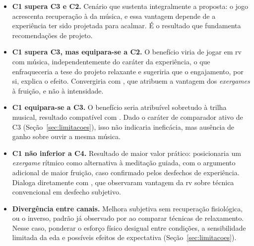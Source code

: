 \begin{itemize}
    \item \textbf{C1 supera C3 e C2.} Cenário que sustenta integralmente a proposta: o jogo acrescenta recuperação à da música, e essa vantagem depende de a experiência ter sido projetada para acalmar. É o resultado que fundamenta recomendações de projeto.
    \item \textbf{C1 supera C3, mas equipara-se a C2.} O benefício viria de jogar em \gls{rv} com música, independentemente do caráter da experiência, o que enfraqueceria a tese do projeto relaxante e sugeriria que o engajamento, por si, explica o efeito. Convergiria com \citet{RubioArias2024}, que atribuem a vantagem dos \textit{exergames} à fruição, e não à intensidade.
    \item \textbf{C1 equipara-se a C3.} O benefício seria atribuível sobretudo à trilha musical, resultado compatível com \citet{Dsouza2024}. Dado o caráter de comparador ativo de C3 (Seção~\ref{sec:limitacoes}), isso não indicaria ineficácia, mas ausência de ganho sobre ouvir a mesma música.
    \item \textbf{C1 não inferior a C4.} Resultado de maior valor prático: posicionaria um \textit{exergame} rítmico como alternativa à meditação guiada, com o argumento adicional de maior fruição, caso confirmado pelos desfechos de experiência. Dialoga diretamente com \citet{Ahn2025}, que observaram vantagem da \gls{rv} sobre técnica convencional em desfecho subjetivo.
    \item \textbf{Divergência entre canais.} Melhora subjetiva sem recuperação fisiológica, ou o inverso, padrão já observado por \citet{Kim2021} ao comparar técnicas de relaxamento. Nesse caso, ponderar o esforço físico desigual entre condições, a sensibilidade limitada da \gls{eda} e possíveis efeitos de expectativa (Seção~\ref{sec:limitacoes}).
\end{itemize}

